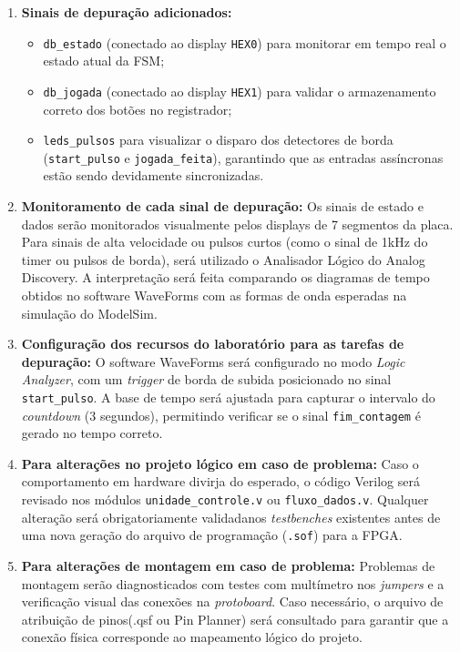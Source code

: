 \documentclass[a4paper,12pt,twoside]{article}
\begin{document}
  \begin{enumerate}
  \def\labelenumi{\alph{enumi})}
  \item
    \textbf{Sinais de depuração adicionados:}
    \begin{itemize}
      \item \texttt{db\_estado} (conectado ao display \texttt{HEX0}) para monitorar em tempo real o estado atual da FSM;
      \item \texttt{db\_jogada} (conectado ao display \texttt{HEX1}) para validar o armazenamento correto dos botões no registrador;
      \item \texttt{leds\_pulsos} para visualizar o disparo dos detectores de borda
  (\texttt{start\_pulso} e \texttt{jogada\_feita}), garantindo que as entradas assíncronas estão sendo devidamente sincronizadas.
    \end{itemize}

  \item
    \textbf{Monitoramento de cada sinal de depuração:}
    Os sinais de estado e dados serão monitorados visualmente pelos displays de 7 segmentos da placa. Para sinais de alta velocidade ou pulsos curtos (como o sinal de 1kHz do timer ou pulsos de borda), será utilizado o Analisador Lógico do Analog Discovery. A interpretação será feita comparando os diagramas de tempo obtidos no software WaveForms com as formas de onda esperadas na simulação do ModelSim.

  \item
    \textbf{Configuração dos recursos do laboratório para as tarefas de depuração:}
    O software WaveForms será configurado no modo \textit{Logic Analyzer}, com um \textit{trigger} de borda de subida posicionado no sinal \texttt{start\_pulso}. A base de tempo será ajustada para capturar o intervalo
  do \textit{countdown} (3 segundos), permitindo verificar se o sinal \texttt{fim\_contagem} é gerado no tempo
  correto.


  \item
    \textbf{Para alterações no projeto lógico em caso de problema:}
    Caso o comportamento em hardware divirja do esperado, o código Verilog será revisado nos módulos \texttt{unidade\_controle.v} ou \texttt{fluxo\_dados.v}. Qualquer alteração será obrigatoriamente validadanos \textit{testbenches} existentes antes de uma nova geração do arquivo de programação (\texttt{.sof}) para a FPGA.

  \item
    \textbf{Para alterações de montagem em caso de problema:}
    Problemas de montagem serão diagnosticados com testes com multímetro nos \textit{jumpers} e a verificação visual das conexões na \textit{protoboard}. Caso necessário, o arquivo de atribuição de pinos(.qsf ou Pin Planner) será consultado para garantir que a conexão física corresponde ao mapeamento lógico do projeto.



\end{enumerate}
\end{document}

